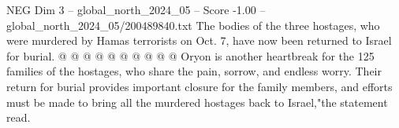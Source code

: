 \begin{textsample}{NEG Dim 3 – global\_north\_2024\_05 – Score -1.00 – global\_north\_2024\_05/200489840.txt}
The bodies of the three hostages, who were murdered by Hamas terrorists on Oct. 7, have now been returned to Israel for burial. @ @ @ @ @ @ @ @ @ @ Oryon is another heartbreak for the 125 families of the hostages, who share the pain, sorrow, and endless worry.
Their return for burial provides important closure for the family members, and efforts must be made to bring all the murdered hostages back to Israel,"the statement read.

\end{textsample}
